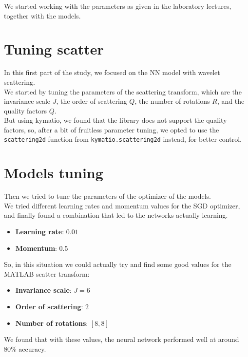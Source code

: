 \documentclass{report}
\begin{document}
We started working with the parameters as given in the laboratory lectures, together with the models.

\section{Tuning scatter}
In this first part of the study, we focused on the NN model with wavelet scattering. \\
We started by tuning the parameters of the scattering transform, which are the invariance scale $J$, the order of scattering $Q$, the number of rotations $R$, and the quality factors $Q$. \\

But using kymatio, we found that the library does not support the quality factors, so, after a bit of fruitless parameter tuning, 
we opted to use the \texttt{scattering2d} function from \texttt{kymatio.scattering2d} instead, for better control. \\

\section{Models tuning}
Then we tried to tune the parameters of the optimizer of the models.\\
We tried different learning rates and momentum values for the SGD optimizer, and finally found a combination that led to the networks actually learning.
\begin{itemize}
  \item \textbf{Learning rate}: $0.01$ 
  \item \textbf{Momentum}: $0.5$
\end{itemize}

So, in this situation we could actually try and find some good values for the MATLAB scatter transform:
\begin{itemize}
  \item \textbf{Invariance scale}: $J=6$
  \item \textbf{Order of scattering}: $2$
  \item \textbf{Number of rotations}: $[8, 8]$
\end{itemize}
We found that with these values, the neural network performed well at around 80\% accuracy.\\
\end{document}

